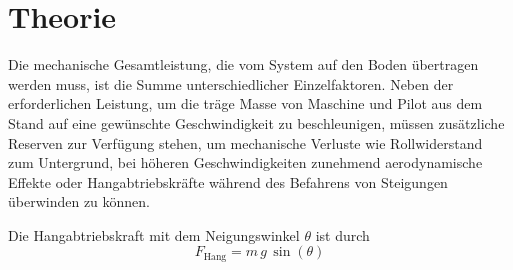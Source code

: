 \chapter{Theorie}\label{sec:theory}
\nocite{Meschede.2015}\nocite{Demtroder.2018}
%
%
%
%
%
%
%
%
%
%
%
%
%
%
%
%
%
%
%
%
%
%
	Die mechanische Gesamtleistung, die vom System auf den Boden übertragen werden muss, ist die Summe unterschiedlicher Einzelfaktoren.
	Neben der erforderlichen Leistung, um die träge Masse von Maschine und Pilot aus dem Stand auf eine gewünschte Geschwindigkeit zu beschleunigen, müssen zusätzliche Reserven zur Verfügung stehen, um mechanische Verluste wie Rollwiderstand zum Untergrund, bei höheren Geschwindigkeiten zunehmend aerodynamische Effekte oder Hangabtriebskräfte während des Befahrens von Steigungen überwinden zu können.\par\medskip
	Die Hangabtriebskraft mit dem Neigungswinkel \(\theta\) ist durch
	\begin{equation}
		F_\text{Hang} = m \, g \, \sin\!\left(\theta\right)%
		\label{eq:downhill force}
	\end{equation}%
	
